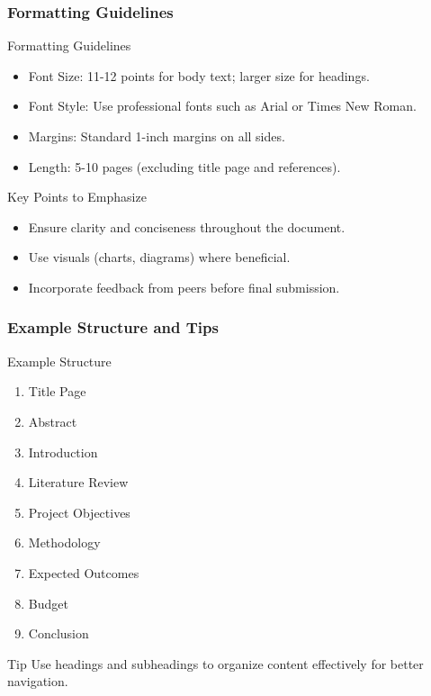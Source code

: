 \documentclass[aspectratio=169]{beamer}
\begin{document}
\begin{frame}[fragile]
  \frametitle{Formatting Guidelines}
  \begin{block}{Formatting Guidelines}
    \begin{itemize}
      \item Font Size: 11-12 points for body text; larger size for headings.
      \item Font Style: Use professional fonts such as Arial or Times New Roman.
      \item Margins: Standard 1-inch margins on all sides.
      \item Length: 5-10 pages (excluding title page and references).
    \end{itemize}
  \end{block}
  
  \begin{block}{Key Points to Emphasize}
    \begin{itemize}
      \item Ensure clarity and conciseness throughout the document.
      \item Use visuals (charts, diagrams) where beneficial.
      \item Incorporate feedback from peers before final submission.
    \end{itemize}
  \end{block}
\end{frame}

\begin{frame}[fragile]
  \frametitle{Example Structure and Tips}
  \begin{block}{Example Structure}
    \begin{enumerate}
      \item Title Page
      \item Abstract
      \item Introduction
      \item Literature Review
      \item Project Objectives
      \item Methodology
      \item Expected Outcomes
      \item Budget
      \item Conclusion
    \end{enumerate}
  \end{block}
  
  \begin{block}{Tip}
    Use headings and subheadings to organize content effectively for better navigation. 
  \end{block}
\end{frame}
\end{document}
